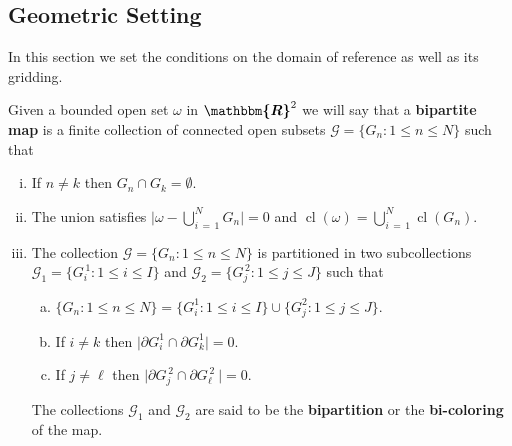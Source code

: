 \documentclass[3p]{elsarticle}
\DeclareMathOperator*{\cl}{cl}
\def\R{\bm{\mathbbm{R} } }
\def\defining{\overset{\mathbf{def}} =}
\begin{document}
\subsection{Geometric Setting}
%
%
In this section we set the conditions on the domain of reference as well as its gridding.
%
%
\begin{definition}
Given a bounded open set $\omega$ in $\R^{2}$ we will say that a \textbf{bipartite map} is a finite collection of connected open subsets $\mathcal{G} = \{G_{n}: 1\leq n \leq N \}$ such that
%
\begin{enumerate}[(i)]
\item If $n\neq k$ then $G_{n}\cap G_{k} = \emptyset$.

\item The union satisfies $\Big\vert \omega - \bigcup\limits_{i\, = \, 1}^{N}  G_{n} \Big\vert = 0$ and $\cl (\omega )= \bigcup\limits_{i\, = \, 1}^{N} \cl (G_{n} )$.

\item The collection $\mathcal{G} =\big\{G_{n}: 1\leq n \leq N \big\}$ is partitioned in two subcollections  $\mathcal{G}_{1} =\big\{G^{\,1}_{i}: 1\leq i \leq I \big\}$ and $\mathcal{G}_{2} = \big\{G^{\,2}_{j}: 1\leq j \leq J \big\}$ such that 
%
\begin{enumerate}[a)]
\item $\big\{G_{n}: 1\leq n \leq N \big\} = 
\big\{G^{1}_{i}: 1\leq i \leq I \big\} \cup 
\big\{G^{2}_{j}: 1\leq j \leq J \big\}$.

\item If $i \neq k$ then $\big\vert\partial G^{1}_{i}\cap \partial G^{1}_{k}\big\vert = 0$.

\item If $j \neq \ell$ then $\big\vert\partial G^{\,2}_{j}\cap \partial G^{\,2}_{\ell}\ \big\vert = 0$.
\end{enumerate}
%
The collections $\mathcal{G}_{1}$ and $\mathcal{G}_{2}$ are said to be the \textbf{bipartition} or the \textbf{bi-coloring} of the map.
\end{enumerate}
%
\end{definition}
\end{document}
